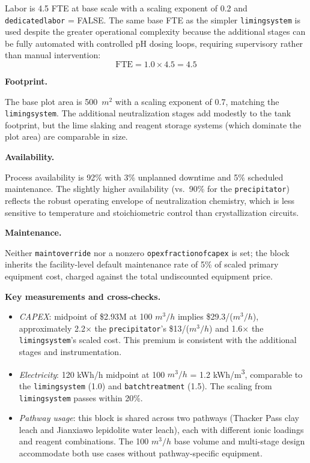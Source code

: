 \documentclass{article}
\renewcommand\_{\textunderscore\allowbreak}
\begin{document}
Labor is 4.5 FTE at base scale with a scaling exponent of 0.2 and \texttt{dedicated\_labor} = FALSE. The same base FTE as the simpler \texttt{liming\_system} is used despite the greater operational complexity because the additional stages can be fully automated with controlled pH dosing loops, requiring supervisory rather than manual intervention:
\[
	\text{FTE} = 1.0 \times 4.5 = 4.5
\]

\medskip
\noindent\textbf{Footprint.}\quad

The base plot area is 500~$\si{m^2}$ with a scaling exponent of 0.7, matching the \texttt{liming\_system}. The additional neutralization stages add modestly to the tank footprint, but the lime slaking and reagent storage systems (which dominate the plot area) are comparable in size.

\medskip
\noindent\textbf{Availability.}\quad

Process availability is 92\% with 3\% unplanned downtime and 5\% scheduled maintenance. The slightly higher availability (vs.\ 90\% for the \texttt{precipitator}) reflects the robust operating envelope of neutralization chemistry, which is less sensitive to temperature and stoichiometric control than crystallization circuits.

\medskip
\noindent\textbf{Maintenance.}\quad

Neither \texttt{maint\_override} nor a nonzero \texttt{opex\_fraction\_of\_capex} is set; the block inherits the facility-level default maintenance rate of 5\% of scaled primary equipment cost, charged against the total undiscounted equipment price.

\medskip
\noindent\textbf{Key measurements and cross-checks.}\quad

\begin{itemize}[noitemsep]
	\item \textit{CAPEX}: midpoint of \$2.93M at 100 $\si{m^3/h}$ implies \$29.3/($\si{m^3/h}$), approximately 2.2$\times$ the \texttt{precipitator}'s \$13/($\si{m^3/h}$) and 1.6$\times$ the \texttt{liming\_system}'s scaled cost. This premium is consistent with the additional stages and instrumentation.
	\item \textit{Electricity}: 120 kWh/h midpoint at 100 $\si{m^3/h}$ = 1.2 \si{kWh/m^3}, comparable to the \texttt{liming\_system} (1.0) and \texttt{batch\_treatment} (1.5). The scaling from \texttt{liming\_system} passes within 20\%.
	\item \textit{Pathway usage}: this block is shared across two pathways (Thacker Pass clay leach and Jianxiawo lepidolite water leach), each with different ionic loadings and reagent combinations. The 100 $\si{m^3/h}$ base volume and multi-stage design accommodate both use cases without pathway-specific equipment.
\end{itemize}
\end{document}
